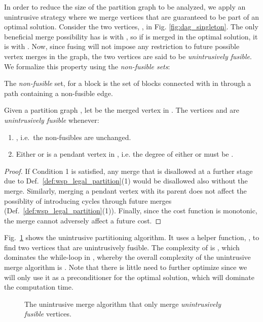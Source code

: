 In order to reduce the size of the partition graph to be analyzed, we apply an
unintrusive strategy where we merge vertices that are guaranteed to be
part of an optimal solution. Consider the two vertices, , in
Fig. \ref{fig:dag_singleton}. The only beneficial merge possibility
 has is with , so if  is merged in the optimal solution, it
is with . Now, since fusing  will not impose any restriction
to future possible vertex merges in the graph, the two vertices are
said to be \emph{unintrusively fusible}. We formalize this property
using the {\em non-fusible sets}:
\begin{definition}
  The {\em non-fusible} set,   for a block 
  is the set of blocks connected with  in  through
  a path containing a non-fusible edge.
\end{definition}
\begin{theorem}
\label{tho:gentle_fusible}
Given a partition graph , let  be the merged
vertex in . The vertices
 and  are {\em unintrusively fusible} whenever:
\begin{enumerate}
    \item , i.e.~the non-fusibles are unchanged. \item Either  or  is a pendant vertex in , i.e. the
         degree of either  or  must be .
\end{enumerate}
\end{theorem}
\begin{proof}
  If Condition 1 is satisfied, any merge that is disallowed at a further
  stage due to Def.~\ref{def:wsp_legal_partition}(1) would be disallowed also without the merge.
  Similarly, merging a pendant vertex with its parent does not affect
  the possiblity of introducing cycles through future merges (Def.~\ref{def:wsp_legal_partition}(1)).
  Finally, since the cost function is monotonic, the merge cannot adversely affect a future cost.
\end{proof}

Fig.~\ref{algo:gently} shows the unintrusive partitioning algorithm. It uses
a helper function, , to find two vertices that are
unintrusively fusible. The complexity of 
is , which dominates the while-loop in ,
whereby the overall complexity of the unintrusive merge algorithm is
. Note that there is little need to further optimize
 since we will only use it as a preconditioner for the
optimal solution, which will dominate the computation time.

\ifdefined\LongVersion
\begin{figure}
\footnotesize
\begin{tcolorbox}
    \AlgoGentlyA
\end{tcolorbox}
\begin{tcolorbox}
    \AlgoGentlyB
\end{tcolorbox}
\caption{The unintrusive merge algorithm that only merge \emph{unintrusively fusible} vertices.}
\label{algo:gently}
\end{figure}
\fi

